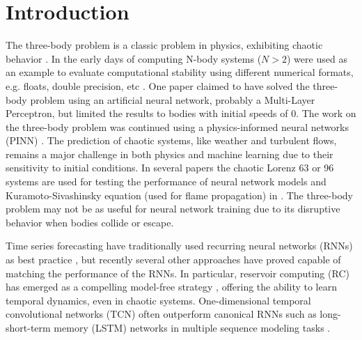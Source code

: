 \documentclass[%
 reprint,
 amsmath,amssymb,
 aps,
]{revtex4-2}
\begin{document}
\maketitle




\section{\label{sec:intro}Introduction} %

The three-body problem is a classic problem in physics, exhibiting chaotic behavior \cite{birkhoff1927dynamical}. In the early days of computing N-body systems ($N>2$) were used as an example to evaluate computational stability using different numerical formats, e.g. floats, double precision, etc \cite{DejongheAndHut1986}. One paper \cite{Breen_2020} claimed to have solved the three-body problem using an artificial neural network, probably a Multi-Layer Perceptron, but limited the results to bodies with initial speeds of 0. The work on the three-body problem was continued using a physics-informed neural networks (PINN) \cite{pereira2025advancingsolutionsthreebodyproblem}.
The prediction of chaotic systems, like weather and turbulent flows, remains a major challenge in both physics and machine learning due to their sensitivity to initial conditions. In several papers the chaotic Lorenz 63 or 96 systems are used for testing the performance of neural network models \cite{vlachas2018data, Chattopadhyay2019} and Kuramoto-Sivashinsky equation (used for flame propagation) in \cite{pathak2018model, vlachas2018data}. The three-body problem may not be as useful for neural network training due to its disruptive behavior when bodies collide or escape.

Time series forecasting have traditionally used recurring neural networks (RNNs) as best practice \cite{vlachas2018data}, but recently several other approaches have proved capable of matching the performance of the RNNs. In particular, reservoir computing (RC) has emerged as a compelling model-free strategy \cite{pathak2018model, Chattopadhyay2019}, offering the ability to learn temporal dynamics, even in chaotic systems. One-dimensional temporal convolutional networks (TCN) often outperform canonical RNNs such as long-short-term memory (LSTM) networks in multiple sequence modeling tasks \cite{bai2018empiricalevaluationgenericconvolutional, luo2024moderntcn}. 
\end{document}
